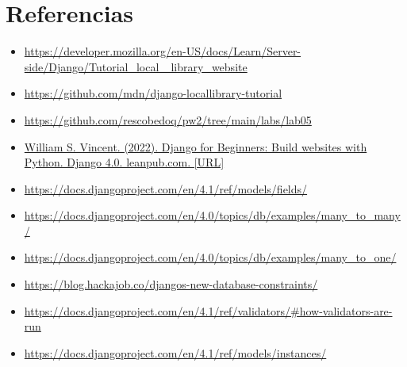 \section{Referencias}
\begin{itemize}			
	\item \url{https://developer.mozilla.org/en-US/docs/Learn/Server-side/Django/Tutorial_local_
library_website}
        \item \url{https://github.com/mdn/django-locallibrary-tutorial}
        \item\url{https://github.com/rescobedoq/pw2/tree/main/labs/lab05}
        \item\url{William S. Vincent. (2022). Django for Beginners: Build websites with Python. Django 4.0.
leanpub.com. [URL]}
        \item\url{https://docs.djangoproject.com/en/4.1/ref/models/fields/}
        \item\url{https://docs.djangoproject.com/en/4.0/topics/db/examples/many_to_many/}
        \item\url{https://docs.djangoproject.com/en/4.0/topics/db/examples/many_to_one/}
        \item\url{https://blog.hackajob.co/djangos-new-database-constraints/}
        \item\url{https://docs.djangoproject.com/en/4.1/ref/validators/#how-validators-are-run}
        \item\url{https://docs.djangoproject.com/en/4.1/ref/models/instances/}
        
        
\end{itemize}	